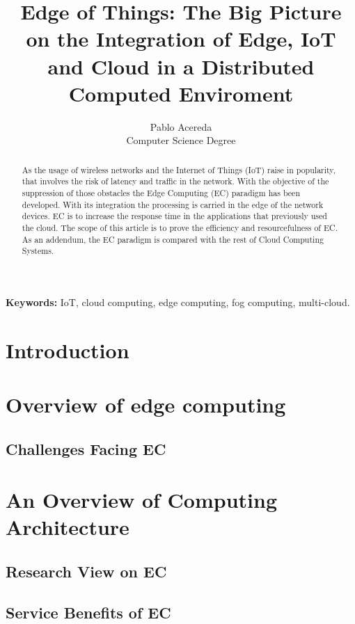 \documentclass[10pt]{article}
\title{
    Edge of Things: The Big Picture on the Integration of Edge, IoT and Cloud in
    a Distributed Computed Enviroment
}
\author{
Pablo Acereda\\
Computer Science Degree\\
}
\begin{document}
\maketitle

\begin{abstract}

    As the usage of wireless networks and the Internet of Things (IoT) raise in
    popularity, that involves the risk of latency and traffic in the network.
    With the objective of the suppression of those obstacles the Edge Computing
    (EC) paradigm has been developed. With its integration the processing is
    carried in the edge of the network devices. EC is to increase the response
    time in the applications that previously used the cloud. The scope of this
    article is to prove the efficiency and resourcefulness of EC. As an
    addendum, the EC paradigm is compared with the rest of Cloud Computing
    Systems.

\end{abstract}

{\bf Keywords:}
    IoT, 
    cloud computing, 
    edge computing, 
    fog computing, 
    multi-cloud.

\section{Introduction}

\section{Overview of edge computing}

\subsection{Challenges Facing EC}

\section{An Overview of Computing Architecture}

\subsection{Research View on EC}

\subsection{Service Benefits of EC}
\end{document}
